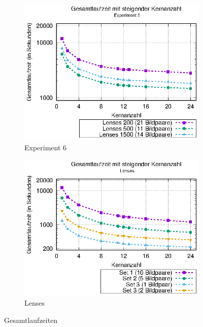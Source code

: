 \begin{center}
	\begin{figure}[h!]
		\begin{subfigure}[b]{0.49\textwidth}
			\centering
			\includegraphics[width=\textwidth]{pdf/times_exp6}
			\caption[Experiment 6]{Experiment 6}
			\label{fig:times_exp6}
		\end{subfigure}
		\hfill
		\begin{subfigure}[b]{0.49\textwidth}
			\centering
			\includegraphics[width=\textwidth]{pdf/times_lenses}
			\caption[Lenses]{Lenses}
			\label{fig:times_lenses}
		\end{subfigure}
		\caption{Gesamtlaufzeiten}
		\label{fig:gesamtlaufzeiten}
	\end{figure}
\end{center}

